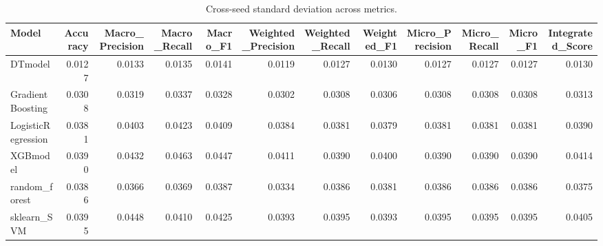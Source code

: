\begin{table}[t]
\centering
\begin{tabular}{lrrrrrrrrrrr}
\toprule
Model & Accuracy & Macro_Precision & Macro_Recall & Macro_F1 & Weighted_Precision & Weighted_Recall & Weighted_F1 & Micro_Precision & Micro_Recall & Micro_F1 & Integrated_Score \\
\midrule
DTmodel & 0.0127 & 0.0133 & 0.0135 & 0.0141 & 0.0119 & 0.0127 & 0.0130 & 0.0127 & 0.0127 & 0.0127 & 0.0130 \\
GradientBoosting & 0.0308 & 0.0319 & 0.0337 & 0.0328 & 0.0302 & 0.0308 & 0.0306 & 0.0308 & 0.0308 & 0.0308 & 0.0313 \\
LogisticRegression & 0.0381 & 0.0403 & 0.0423 & 0.0409 & 0.0384 & 0.0381 & 0.0379 & 0.0381 & 0.0381 & 0.0381 & 0.0390 \\
XGBmodel & 0.0390 & 0.0432 & 0.0463 & 0.0447 & 0.0411 & 0.0390 & 0.0400 & 0.0390 & 0.0390 & 0.0390 & 0.0414 \\
random_forest & 0.0386 & 0.0366 & 0.0369 & 0.0387 & 0.0334 & 0.0386 & 0.0381 & 0.0386 & 0.0386 & 0.0386 & 0.0375 \\
sklearn_SVM & 0.0395 & 0.0448 & 0.0410 & 0.0425 & 0.0393 & 0.0395 & 0.0393 & 0.0395 & 0.0395 & 0.0395 & 0.0405 \\
\bottomrule
\end{tabular}
\caption{Cross-seed standard deviation across metrics.}
\label{tab:cross_seed_std}
\end{table}